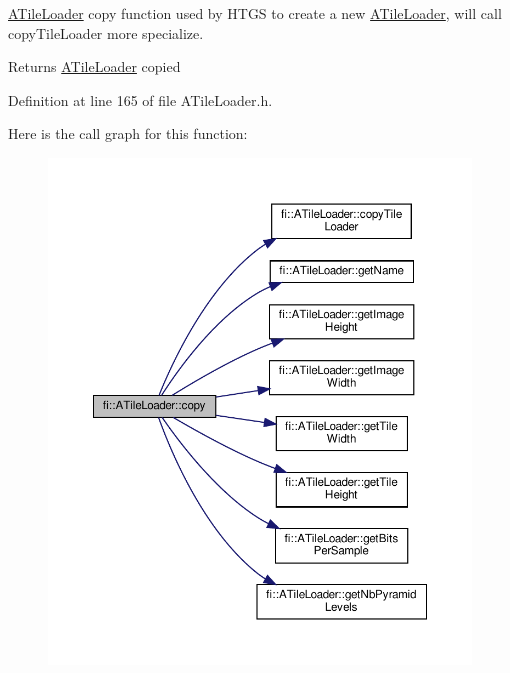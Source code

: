 \hyperlink{classfi_1_1ATileLoader}{A\+Tile\+Loader} copy function used by H\+T\+GS to create a new \hyperlink{classfi_1_1ATileLoader}{A\+Tile\+Loader}, will call copy\+Tile\+Loader more specialize. 

\begin{DoxyReturn}{Returns}
\hyperlink{classfi_1_1ATileLoader}{A\+Tile\+Loader} copied 
\end{DoxyReturn}


Definition at line 165 of file A\+Tile\+Loader.\+h.

Here is the call graph for this function\+:
\nopagebreak
\begin{figure}[H]
\begin{center}
\leavevmode
\includegraphics[width=350pt]{dc/d54/classfi_1_1ATileLoader_a6f842aefc3db84a1c95edaa9f550c1e7_cgraph}
\end{center}
\end{figure}
\mbox{\label{classfi_1_1ATileLoader_a99bd30a8283474c5bf667054a83a008d}} 
